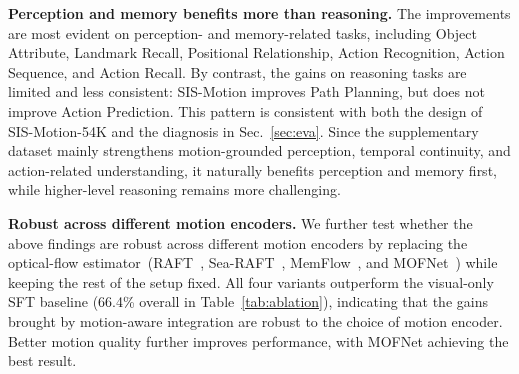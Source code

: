 \documentclass[sigconf, screen, review, anonymous]{acmart}
\begin{document}
\noindent \textbf{Perception and memory benefits more than reasoning.}
The improvements are most evident on perception- and memory-related tasks, including Object Attribute, Landmark Recall, Positional Relationship, Action Recognition, Action Sequence, and Action Recall. By contrast, the gains on reasoning tasks are limited and less consistent: SIS-Motion improves Path Planning, but does not improve Action Prediction. This pattern is consistent with both the design of SIS-Motion-54K and the diagnosis in Sec.~\ref{sec:eva}. Since the supplementary dataset mainly strengthens motion-grounded perception, temporal continuity, and action-related understanding, it naturally benefits perception and memory first, while higher-level reasoning remains more challenging.

\noindent \textbf{Robust across different motion encoders.} We further test whether the above findings are robust across different motion encoders by replacing the optical-flow estimator~(RAFT~\cite{teed2020raft}, Sea-RAFT~\cite{wang2024sea}, MemFlow~\cite{dong2024memflow}, and MOFNet~\cite{shi2023videoflow}) while keeping the rest of the setup fixed. All four variants outperform the visual-only SFT baseline (66.4\% overall in Table~\ref{tab:ablation}), indicating that the gains brought by motion-aware integration are robust to the choice of motion encoder. Better motion quality further improves performance, with MOFNet achieving the best result.



\setlength{\tabcolsep}{3pt}
\begin{table}[t]
\centering
\caption{Ablation on optical-flow estimators under the same SIS-Motion framework.}
\label{tab:flow_ablation}
\scriptsize
\renewcommand{\arraystretch}{1.05}
\end{table}
\end{document}
